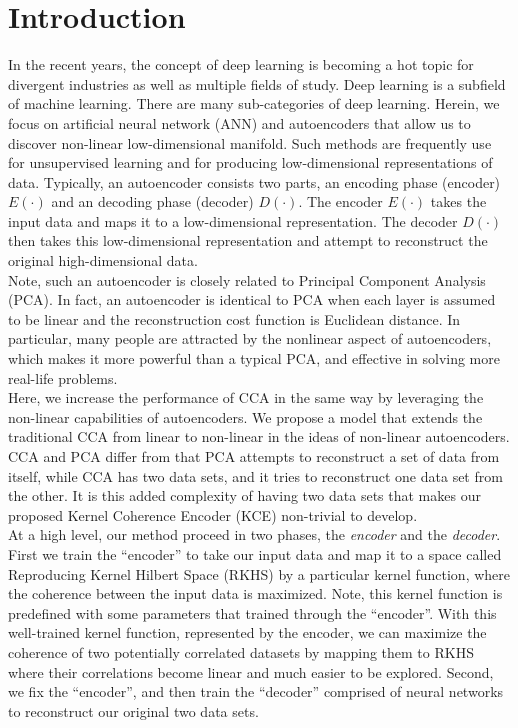 \documentclass[12pt]{report} %
\begin{document}
\chapter{Introduction}
In the recent years, the concept of deep learning is becoming a hot topic for divergent industries as well as multiple fields of study\cite{AUKM,TF,PR,DLRG}. Deep learning is a subfield of machine learning. There are many sub-categories of deep learning. Herein, we focus on artificial neural network (ANN)\cite{NN,NN2} and autoencoders\cite{AE,AE2,AE3} that allow us to discover non-linear low-dimensional manifold. Such methods are frequently use for unsupervised learning and for producing low-dimensional representations of data. Typically, an autoencoder consists two parts, an encoding phase (encoder) \(E(\cdot)\) and an decoding phase (decoder) \(D(\cdot)\). The encoder \(E(\cdot)\) takes the input data and maps it to a low-dimensional representation. The decoder \(D(\cdot)\) then takes this low-dimensional representation and attempt to reconstruct the original high-dimensional data.\\
Note, such an autoencoder is closely related to Principal Component Analysis (PCA)\cite{PCA,PCA2,STAT,KPCA}. In fact, an autoencoder is identical to PCA when each layer is assumed to be linear and the reconstruction cost function is Euclidean distance. In particular, many people are attracted by the nonlinear aspect of autoencoders, which makes it more powerful than a typical PCA, and effective in solving more real-life problems. \\
Here, we increase the performance of CCA\cite{CCA,ECCA,KCCA} in the same way by leveraging the non-linear capabilities of autoencoders. We propose a model that extends the traditional CCA from linear to non-linear in the ideas of non-linear autoencoders. CCA and PCA differ from that PCA attempts to reconstruct a set of data from itself, while CCA has two data sets, and it tries to reconstruct one data set from the other. It is this added complexity of having two data sets that makes our proposed Kernel Coherence Encoder (KCE) non-trivial to develop. \\
At a high level, our method proceed in two phases, the \textit{encoder} and the \textit{decoder}. First we train the ``encoder'' to take our input data and map it to a space called Reproducing Kernel Hilbert Space (RKHS)\cite{RKHS} by a particular kernel function, where the coherence between the input data is maximized. Note, this kernel function is predefined with some parameters that trained through the ``encoder''. With this well-trained kernel function, represented by the encoder, we can maximize the coherence of two potentially correlated datasets by mapping them to RKHS where their correlations become linear and much easier to be explored. Second, we fix the ``encoder'', and then train the ``decoder'' comprised of neural networks to reconstruct our original two data sets.
\end{document}
